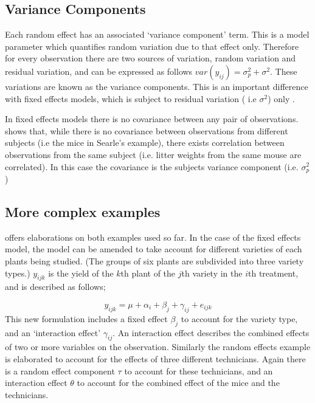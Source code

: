 \documentclass[12pt, a4paper]{report}
\theoremstyle{plain}
\theoremstyle{definition}
\theoremstyle{remark}
\begin{document}
\subsection{Variance Components}
Each random effect has an associated `variance component' term.
This is a model parameter which quantifies random variation due to
that effect only. Therefore for every observation there are two
sources of variation, random variation and residual variation, and
can be expressed as follows $var(y_{ij})=\sigma^{2}_{p} +
\sigma^{2}$. These variations are known as the variance
components. This is an important difference with fixed effects
models, which is subject to residual variation ( i.e $\sigma^{2}$)
only \citep{BrownPrescott}.

In fixed effects models there is no covariance between any pair of
observations. \citet*{BrownPrescott} shows that, while there is no
covariance between observations from different subjects (i.e the
mice in Searle's example), there exists correlation between
observations from the same subject (i.e. litter weights from the
same mouse are correlated). In this case the covariance is the
subjects variance component (i.e. $\sigma^{2}_{p}$)

\subsection{More complex examples}
\citet{Searle} offers elaborations on both examples used so far.
In the case of the fixed effects model, the model can be amended
to take account for different varieties of each plants being
studied. (The groups of six plants are subdivided into three
variety types.) $y_{ijk}$ is the yield of the $k$th plant of the
$j$th variety in the $i$th treatment, and is described as follows;

\begin{equation}
y_{ijk} = \mu + \alpha_{i} + \beta_{j} + \gamma_{ij} + e_{ijk}
\end{equation}
This new formulation includes a fixed effect $\beta_{j}$ to
account for the variety type, and an `interaction effect'
$\gamma_{ij}$. An interaction effect describes the combined
effects of two or more variables on the observation. Similarly the
random effects example is elaborated to account for the effects of
three different technicians. Again there is a random effect
component $\tau$ to account for these technicians, and an
interaction effect $\theta$ to account for the combined effect of
the mice and the technicians.
\end{document}
